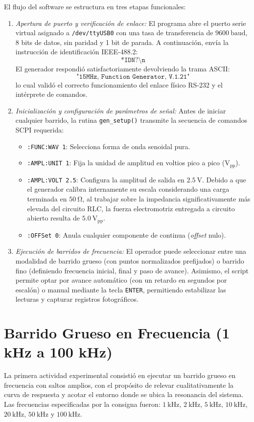 El flujo del software se estructura en tres etapas funcionales:
\begin{enumerate}
    \item \emph{Apertura de puerto y verificación de enlace:} El programa abre el puerto serie virtual asignado a
    \texttt{/dev/ttyUSB0} con una tasa de transferencia de $\qty{9600}{\text{baud}}$, 8 bits de datos, sin paridad y
    1 bit de parada. A continuación, envía la instrucción de identificación IEEE-488.2:
    \[
        \texttt{*IDN?\textbackslash n}
    \]
    El generador respondió satisfactoriamente devolviendo la trama ASCII:
    \[
        \texttt{"15MHz, Function Generator, V.1.21"}
    \]
    lo cual validó el correcto funcionamiento del enlace físico RS-232 y el intérprete de comandos.
    \item \emph{Inicialización y configuración de parámetros de señal:} Antes de iniciar cualquier barrido, la rutina
    \texttt{gen\_setup()} transmite la secuencia de comandos SCPI requerida:
    \begin{itemize}
        \item \texttt{:FUNC:WAV 1}: Selecciona forma de onda senoidal pura.
        \item \texttt{:AMPL:UNIT 1}: Fija la unidad de amplitud en voltios pico a pico ($\mathrm{V_{pp}}$).
        \item \texttt{:AMPL:VOLT 2.5}: Configura la amplitud de salida en $\qty{2.5}{\volt}$. Debido a que el
        generador calibra internamente su escala considerando una carga terminada en $\qty{50}{\ohm}$, al trabajar
        sobre la impedancia significativamente más elevada del circuito RLC, la fuerza electromotriz entregada a circuito
        abierto resulta de $\qty{5.0}{\volt_{\text{pp}}}$.
        \item \texttt{:OFFSet 0}: Anula cualquier componente de continua (\emph{offset} nulo).
    \end{itemize}
    \item \emph{Ejecución de barridos de frecuencia:} El operador puede seleccionar entre una modalidad de barrido
    grueso (con puntos normalizados prefijados) o barrido fino (definiendo frecuencia inicial, final y paso de avance).
    Asimismo, el script permite optar por avance automático (con un retardo en segundos por escalón) o manual mediante
    la tecla \texttt{ENTER}, permitiendo estabilizar las lecturas y capturar registros fotográficos.
\end{enumerate}

\section{Barrido Grueso en Frecuencia (1 kHz a 100 kHz)}
La primera actividad experimental consistió en ejecutar un barrido grueso en frecuencia con saltos amplios, con el
propósito de relevar cualitativamente la curva de respuesta y acotar el entorno donde se ubica la resonancia del sistema.
Las frecuencias especificadas por la consigna fueron: $\qty{1}{\kilo\hertz}$, $\qty{2}{\kilo\hertz}$, $\qty{5}{\kilo\hertz}$,
$\qty{10}{\kilo\hertz}$, $\qty{20}{\kilo\hertz}$, $\qty{50}{\kilo\hertz}$ y $\qty{100}{\kilo\hertz}$.

